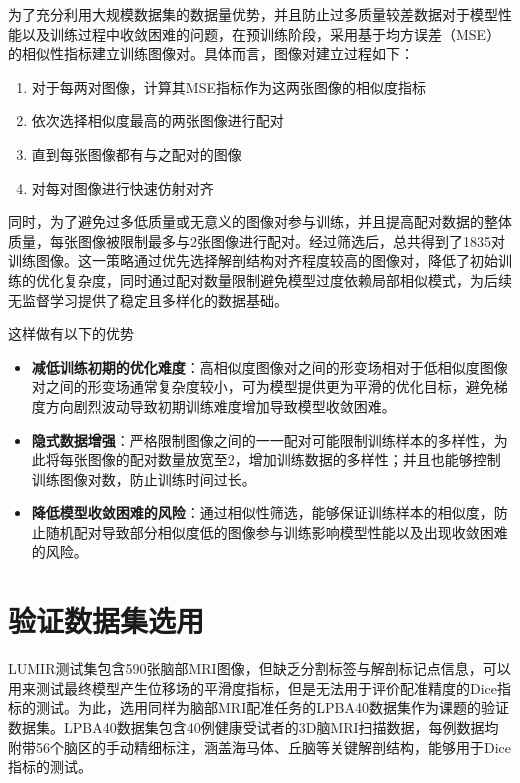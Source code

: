 为了充分利用大规模数据集的数据量优势，并且防止过多质量较差数据对于模型性能以及训练过程中收敛困难的问题，在预训练阶段，采用基于均方误差（MSE）的相似性指标建立训练图像对。具体而言，图像对建立过程如下：

\begin{enumerate}
    \item 对于每两对图像，计算其MSE指标作为这两张图像的相似度指标
    \item 依次选择相似度最高的两张图像进行配对
    \item 直到每张图像都有与之配对的图像
    \item 对每对图像进行快速仿射对齐
\end{enumerate}

同时，为了避免过多低质量或无意义的图像对参与训练，并且提高配对数据的整体质量，每张图像被限制最多与2张图像进行配对。经过筛选后，总共得到了1835对训练图像。这一策略通过优先选择解剖结构对齐程度较高的图像对，降低了初始训练的优化复杂度，同时通过配对数量限制避免模型过度依赖局部相似模式，为后续无监督学习提供了稳定且多样化的数据基础。

这样做有以下的优势

\begin{itemize}
    \item \textbf{减低训练初期的优化难度}：高相似度图像对之间的形变场相对于低相似度图像对之间的形变场通常复杂度较小，可为模型提供更为平滑的优化目标，避免梯度方向剧烈波动导致初期训练难度增加导致模型收敛困难。
    \item \textbf{隐式数据增强}：严格限制图像之间的一一配对可能限制训练样本的多样性，为此将每张图像的配对数量放宽至2，增加训练数据的多样性；并且也能够控制训练图像对数，防止训练时间过长。
    \item \textbf{降低模型收敛困难的风险}：通过相似性筛选，能够保证训练样本的相似度，防止随机配对导致部分相似度低的图像参与训练影响模型性能以及出现收敛困难的风险。
\end{itemize}

\section{验证数据集选用}

LUMIR测试集包含590张脑部MRI图像，但缺乏分割标签与解剖标记点信息，可以用来测试最终模型产生位移场的平滑度指标，但是无法用于评价配准精度的Dice指标的测试。为此，选用同样为脑部MRI配准任务的LPBA40数据集作为课题的验证数据集。LPBA40数据集包含40例健康受试者的3D脑MRI扫描数据，每例数据均附带56个脑区的手动精细标注，涵盖海马体、丘脑等关键解剖结构，能够用于Dice指标的测试。

